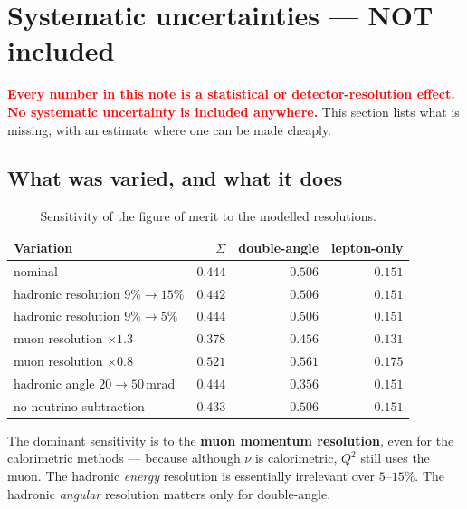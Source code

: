 \documentclass[11pt,a4paper]{article}
\newcommand{\note}[1]{\textcolor{red}{\textbf{#1}}}
\begin{document}
\section{Systematic uncertainties --- NOT included}
\label{sec:syst}

\note{Every number in this note is a statistical or detector-resolution effect.
No systematic uncertainty is included anywhere.} This section lists what is
missing, with an estimate where one can be made cheaply.

\subsection{What was varied, and what it does}
\begin{table}[htbp]
\centering\small
\begin{tabular}{lrrr}
\toprule
Variation & $\Sigma$ & double-angle & lepton-only \\
\midrule
nominal & $0.444$ & $0.506$ & $0.151$ \\
hadronic resolution $9\%\to15\%$ & $0.442$ & $0.506$ & $0.151$ \\
hadronic resolution $9\%\to5\%$ & $0.444$ & $0.506$ & $0.151$ \\
muon resolution $\times1.3$ & $0.378$ & $0.456$ & $0.131$ \\
muon resolution $\times0.8$ & $0.521$ & $0.561$ & $0.175$ \\
hadronic angle $20\to50\,$mrad & $0.444$ & $0.356$ & $0.151$ \\
no neutrino subtraction & $0.433$ & $0.506$ & $0.151$ \\
\bottomrule
\end{tabular}
\caption{Sensitivity of the figure of merit to the modelled resolutions.}
\label{tab:syst}
\end{table}

The dominant sensitivity is to the \textbf{muon momentum resolution}, even for
the calorimetric methods --- because although $\nu$ is calorimetric, $Q^2$ still
uses the muon. The hadronic \emph{energy} resolution is essentially irrelevant
over $5$--$15\%$. The hadronic \emph{angular} resolution matters only for
double-angle.
\end{document}

